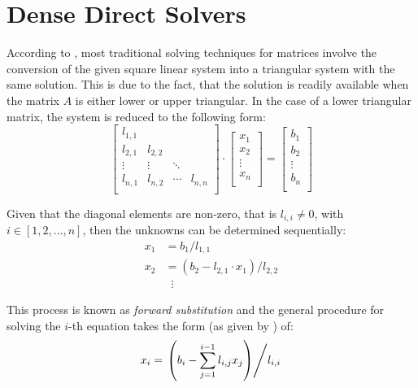 \section{Dense Direct Solvers}
\label{sec:direct_solvers}

According to \cite{golub_matrix_2013}, most traditional solving techniques for matrices involve the conversion of the given square linear system into a triangular system with the same solution. This is due to the fact, that the solution is readily available when the matrix $A$ is either lower or upper triangular. In the case of a lower triangular matrix, the system is reduced to the following form:
\begin{equation}
  \left[
    \begin{array}{cccc}
      l_{1,1} &  &  & \\
      l_{2,1} & l_{2,2} &  &  \\
      \vdots& \vdots & \ddots &  \\
      l_{n,1} & l_{n,2} & \cdots & l_{n,n}\\
    \end{array}
  \right] \cdot
  \left[
    \begin{array}{c}
      x_{1} \\
      x_{2} \\
      \vdots \\
      x_{n}  \\
    \end{array}
  \right] = 
  \left[
    \begin{array}{c}
      b_{1} \\
      b_{2} \\
      \vdots \\
      b_{n}  \\
    \end{array}
  \right] 
\end{equation}

\noindent Given that the diagonal elements are non-zero, that is $l_{i,i} \neq 0$, with $i \in [1,2, \dots, n]$, then the unknowns can be determined sequentially:
\begin{equation}
\begin{aligned}
    x_1 & =  b_1/l_{1,1} \\
    x_2 & =  (b_2-l_{2,1}\cdot x_1)/l_{2,2} \\
    & \;\;\vdots 
\end{aligned}
\end{equation}

\noindent This process is known as \textit{forward substitution} and the general procedure for solving the $i$-th equation takes the form (as given by \cite{golub_matrix_2013}) of:
\begin{equation}
    x_i=\left. \left( b_i-\sum_{j=1}^{i-1}l_{i,j}x_j\right) \middle/ l_{i,i} \right.
\end{equation}


